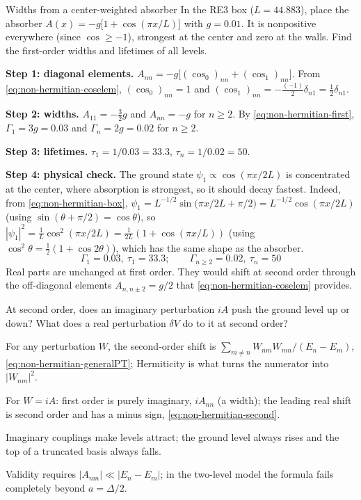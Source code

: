 \begin{sample}{Widths from a center-weighted absorber}
In the RE3 box ($L=44.883$), place the absorber $A(x)=-g\bigl[1+\cos(\pi x/L)\bigr]$ with $g=0.01$. It is nonpositive everywhere (since $\cos\ge-1$), strongest at the center and zero at the walls. Find the first-order widths and lifetimes of all levels.

\textbf{Step 1: diagonal elements.} $A_{nn}=-g\bigl[(\cos_0)_{nn}+(\cos_1)_{nn}\bigr]$. From \eqref{eq:non-hermitian-coselem}, $(\cos_0)_{nn}=1$ and $(\cos_1)_{nn}=-\tfrac{(-1)}{2}\delta_{n1}=\tfrac12\delta_{n1}$.

\textbf{Step 2: widths.} $A_{11}=-\tfrac32 g$ and $A_{nn}=-g$ for $n\ge2$. By \eqref{eq:non-hermitian-first}, $\Gamma_1=3g=0.03$ and $\Gamma_n=2g=0.02$ for $n\ge2$.

\textbf{Step 3: lifetimes.} $\tau_1=1/0.03=33.3$, $\tau_n=1/0.02=50$.

\textbf{Step 4: physical check.} The ground state $\psi_1\propto\cos(\pi x/2L)$ is concentrated at the center, where absorption is strongest, so it should decay fastest. Indeed, from \eqref{eq:non-hermitian-box}, $\psi_1=L^{-1/2}\sin\bigl(\pi x/2L+\pi/2\bigr)=L^{-1/2}\cos(\pi x/2L)$ (using $\sin(\theta+\pi/2)=\cos\theta$), so $|\psi_1|^2=\frac1L\cos^2(\pi x/2L)=\frac{1}{2L}(1+\cos(\pi x/L))$ (using $\cos^2\theta=\tfrac12(1+\cos2\theta)$), which has the same shape as the absorber.
\[
\boxed{\Gamma_1 = 0.03,\ \tau_1=33.3;\qquad \Gamma_{n\ge2}=0.02,\ \tau_n = 50}
\]
Real parts are unchanged at first order. They would shift at second order through the off-diagonal elements $A_{n,n\pm2}=g/2$ that \eqref{eq:non-hermitian-coselem} provides.
\end{sample}

\begin{checkpoint}
At second order, does an imaginary perturbation $iA$ push the ground level up or down? What does a real perturbation $\delta V$ do to it at second order?
\end{checkpoint}

\begin{keyideas}
\item For any perturbation $W$, the second-order shift is $\sum_{m\ne n}W_{nm}W_{mn}/(E_n-E_m)$, \eqref{eq:non-hermitian-generalPT}; Hermiticity is what turns the numerator into $|W_{nm}|^2$.
\item For $W=iA$: first order is purely imaginary, $iA_{nn}$ (a width); the leading real shift is second order and has a minus sign, \eqref{eq:non-hermitian-second}.
\item Imaginary couplings make levels attract; the ground level always rises and the top of a truncated basis always falls.
\item Validity requires $|A_{nm}|\ll|E_n-E_m|$; in the two-level model the formula fails completely beyond $a=\Delta/2$.
\end{keyideas}

